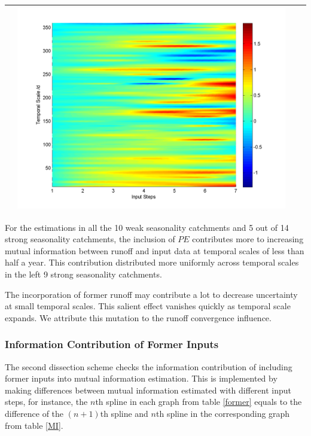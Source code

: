 \documentclass[11pt]{article}
\begin{document}
\begin{table}[H]
{\begin{tabular}{cccc}
&\begin{minipage}{.3\textwidth}\includegraphics[width=\linewidth]{resultgraph/06810000diff_q.png}\end{minipage}
\\
\bottomrule
\end{tabular}
}
\end{table}

For the estimations in all the 10 weak seasonality catchments and 5 out of 14 strong seasonality catchments, the inclusion of $PE$  contributes more to increasing mutual information between runoff and input data at temporal scales of less than half a year. This contribution distributed more uniformly across temporal scales in the left 9 strong seasonality catchments. 

The incorporation of former runoff may contribute a lot to decrease uncertainty at small temporal scales. This salient effect vanishes quickly as temporal scale expands. We attribute this  mutation to the runoff convergence influence.     
 

\subsubsection{Information Contribution of Former Inputs}

The second dissection scheme checks the information contribution of including former inputs into mutual information estimation. This is implemented by making differences between mutual information estimated with different input steps, for instance, the $n$th spline in each graph from table \ref{former}  equals to the difference of the   $(n+1)$th spline and  $n$th spline in the corresponding graph from table \ref{MI}.
\end{document}
